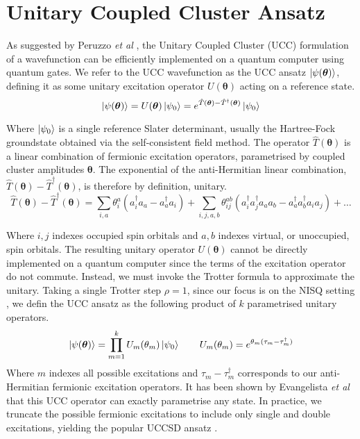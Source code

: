 \section{Unitary Coupled Cluster Ansatz}%
\label{unitary-coupled-cluster-ansatz}

As suggested by Peruzzo \textit{et al} \cite{Peruzzo2014}, the Unitary Coupled Cluster (UCC) formulation of a wavefunction can be efficiently implemented on a quantum computer using quantum gates. We refer to the UCC wavefunction as the UCC ansatz $\ket{\psi(\bm\theta)}$, defining it as some unitary excitation operator $U(\bm\theta)$ acting on a reference state.
\begin{equation*}
    \ket{\psi(\bm\theta)} = U(\bm\theta) \ket{\psi_0} =
    e^{\hat T(\bm\theta) - \hat T^\dagger(\bm\theta)} \ket{\psi_0}
\end{equation*}

Where $\ket{\psi_0}$ is a single reference Slater determinant, usually the Hartree-Fock groundstate obtained via the self-consistent field method. The operator $\hat T(\bm\theta)$ is a linear combination of fermionic excitation operators, parametrised by coupled cluster amplitudes $\bm\theta$. The exponential of the anti-Hermitian linear combination, $\hat T(\bm\theta) - \hat T^\dagger(\bm\theta)$, is therefore by definition, unitary. 
\begin{equation*}
\hat T(\bm{\theta}) - \hat T^{\dagger}(\bm{\theta}) =
\sum_{i, a} \theta^a_i (a^\dagger_i a_a - a^\dagger_a a_i) + 
\sum_{i, j, a, b} \theta^{ab}_{ij} (a^\dagger_i a^\dagger_j a_a a_b - a^\dagger_a a^\dagger_b a_i a_j) + \dots
\end{equation*}

Where $i, j$ indexes occupied spin orbitals and $a, b$ indexes virtual, or unoccupied, spin orbitals. The resulting unitary operator $U(\bm\theta)$ cannot be directly implemented on a quantum computer since the terms of the excitation operator do not commute. Instead, we must invoke the Trotter formula to approximate the unitary. Taking a single Trotter step $\rho=1$, since our focus is on the NISQ setting \cite{Cowtan2020}, we defin the UCC ansatz as the following product of $k$ parametrised unitary operators.
\begin{equation*}
    \ket{\psi(\bm\theta)} = \prod_{m=1}^k U_m(\theta_m) \ket{\psi_0} \qquad
    U_m(\theta_m) = e^{\theta_m (\tau_m - \tau_m^\dagger)}
\end{equation*}
Where $m$ indexes all possible excitations and $\tau_m - \tau_m^\dagger$ corresponds to our anti-Hermitian fermionic excitation operators. It has been shown by Evangelista \textit{et al} \cite{Evangelista2019} that this UCC operator can exactly parametrise any state. In practice, we truncate the possible fermionic excitations to include only single and double excitations, yielding the popular UCCSD ansatz \cite{Chan2021}.

